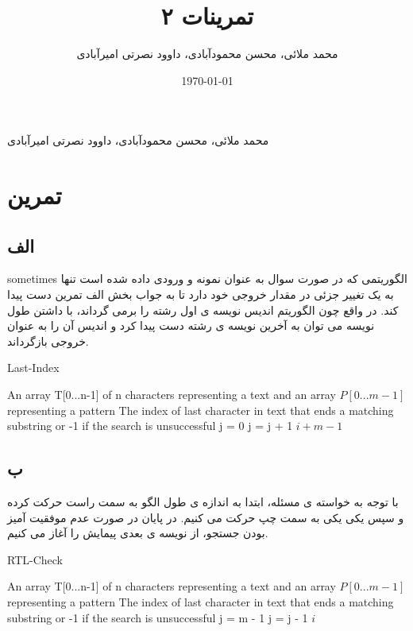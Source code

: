 \documentclass{article}
\date{\today}
\title{تمرینات ۲}
\author{محمد ملائی، محسن محمودآبادی، داوود نصرتی امیرآبادی}
\begin{document}
\begin{center}
    {محمد ملائی،  محسن محمودآبادی،  داوود نصرتی امیرآبادی}
\end{center}
\pagebreak
\section{تمرین}
\subsection{الف}
sometimes
الگوریتمی که در صورت سوال به عنوان نمونه و ورودی داده شده است تنها به یک تغییر جزئی در 
مقدار خروجی خود دارد تا به جواب بخش الف تمرین دست پیدا کند. در واقع چون الگوریتم اندیس نویسه ی اول رشته را 
برمی گرداند، با داشتن طول نویسه می توان به آخرین نویسه ی رشته دست پیدا کرد و اندیس آن را 
به عنوان خروجی بازگرداند.
\begin{latin}
    \begin{algorithm}
        \caption{Last-Index}
        \begin{algorithmic}
            \Require An array T[0...n-1] of n characters representing a text
            and an array $P[0...m-1]$ representing a pattern
            \Ensure The index of last character in text that ends a matching substring or -1 if the search is unsuccessful
                \State j = 0
                    \State j = j + 1
                \EndWhile
                    \State \Return $ i + m - 1$
                \EndIf
            \EndFor
            \State {}
        \end{algorithmic}
    \end{algorithm}
\end{latin}
\subsection{ب}
با توجه به خواسته ی مسئله،
ابتدا به اندازه ی طول الگو به سمت راست حرکت کرده و سپس یکی یکی به سمت چپ
حرکت می کنیم.  در پایان در صورت عدم موفقیت آمیز بودن جستجو، از نویسه ی بعدی پیمایش را آغاز می کنیم.
\begin{latin}
    \begin{algorithm}
        \caption{RTL-Check}
        \begin{algorithmic}
            \Require An array T[0...n-1] of n characters representing a text
            and an array $P[0...m-1]$ representing a pattern
            \Ensure The index of last character in text that ends a matching substring or -1 if the search is unsuccessful
                \State j = m - 1
                    \State j = j - 1
                \EndWhile
                    \State \Return $ i $
                \EndIf
            \EndFor
            \State {}
        \end{algorithmic}
    \end{algorithm}
\end{latin}
\end{document}
